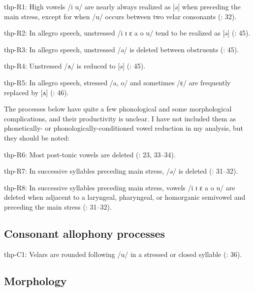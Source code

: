 {\begin{appendixdesc}
\item[thp-R1:] High vowels /i u/ are nearly always realized as [ə] when preceding the main stress, except for when /u/ occurs between two velar consonants (\citealt{ThompsonThompson1992}: 32).

\item[thp-R2:] In allegro speech, unstressed /i ɪ ɛ a o u/ tend to be realized as [ə] (\citealt{ThompsonThompson1992}: 45).

\item[thp-R3:] In allegro speech, unstressed /ə/ is deleted between obstruents (\citealt{ThompsonThompson1992}: 45).

\item[thp-R4:] Unstressed /ʌ/ is reduced to [ə] (\citealt{ThompsonThompson1992}: 45).

\item[thp-R5:] In allegro speech, stressed /a, o/ and sometimes /ɛ/ are frequently replaced by [ʌ] (\citealt{ThompsonThompson1992}: 46).

The processes below have quite a few phonological and some morphological complications, and their productivity is unclear. I have not included them as phonetically- or phonologically-conditioned vowel reduction in my analysis, but they should be noted:

\item[thp-R6:] Most post-tonic vowels are deleted (\citealt{ThompsonThompson1992}: 23, 33--34).

\item[thp-R7:] In successive syllables preceding main stress, /ə/ is deleted (\citealt{ThompsonThompson1992}: 31--32).

\item[thp-R8:] In successive syllables preceding main stress, vowels /i ɪ ɛ a o u/ are deleted when adjacent to a laryngeal, pharyngeal, or homorganic semivowel and preceding the main stress (\citealt{ThompsonThompson1992}: 31--32).
\end{appendixdesc}
\subsection*{Consonant allophony processes}
\begin{appendixdesc}

\item[thp-C1:] Velars are rounded following /u/ in a stressed or closed syllable (\citealt{ThompsonThompson1992}: 36).
\end{appendixdesc}
\subsection*{Morphology}

}

